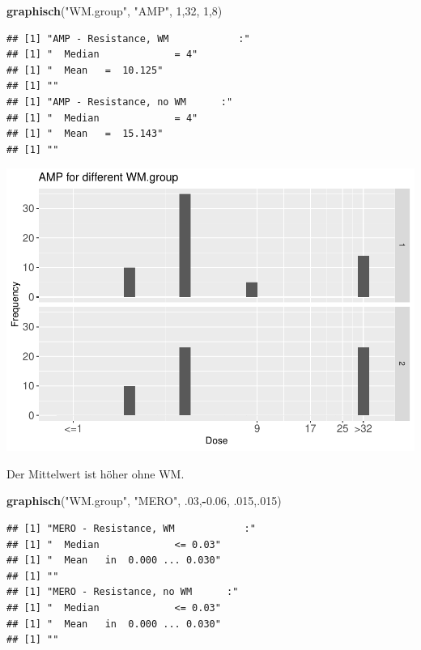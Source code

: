 \documentclass[
]{article}
\newenvironment{Shaded}{\begin{snugshade}}{\end{snugshade}}
\newcommand{\DecValTok}[1]{\textcolor[rgb]{0.00,0.00,0.81}{#1}}
\newcommand{\FloatTok}[1]{\textcolor[rgb]{0.00,0.00,0.81}{#1}}
\newcommand{\KeywordTok}[1]{\textcolor[rgb]{0.13,0.29,0.53}{\textbf{#1}}}
\newcommand{\NormalTok}[1]{#1}
\newcommand{\OperatorTok}[1]{\textcolor[rgb]{0.81,0.36,0.00}{\textbf{#1}}}
\newcommand{\StringTok}[1]{\textcolor[rgb]{0.31,0.60,0.02}{#1}}
\begin{document}
\begin{Shaded}
\begin{Highlighting}[]
  \KeywordTok{graphisch}\NormalTok{(}\StringTok{"WM.group"}\NormalTok{, }\StringTok{"AMP"}\NormalTok{, }\DecValTok{1}\NormalTok{,}\DecValTok{32}\NormalTok{, }\DecValTok{1}\NormalTok{,}\DecValTok{8}\NormalTok{)}
\end{Highlighting}
\end{Shaded}

\begin{verbatim}
## [1] "AMP - Resistance, WM            :"
## [1] "  Median             = 4"
## [1] "  Mean   =  10.125"
## [1] ""
## [1] "AMP - Resistance, no WM      :"
## [1] "  Median             = 4"
## [1] "  Mean   =  15.143"
## [1] ""
\end{verbatim}

\includegraphics{Verteilungen_files/figure-latex/unnamed-chunk-31-1.pdf}

Der Mittelwert ist höher ohne WM.

\begin{Shaded}
\begin{Highlighting}[]
  \KeywordTok{graphisch}\NormalTok{(}\StringTok{"WM.group"}\NormalTok{, }\StringTok{"MERO"}\NormalTok{, }\FloatTok{.03}\NormalTok{,}\OperatorTok{-}\FloatTok{0.06}\NormalTok{, }\FloatTok{.015}\NormalTok{,.}\DecValTok{015}\NormalTok{)}
\end{Highlighting}
\end{Shaded}

\begin{verbatim}
## [1] "MERO - Resistance, WM            :"
## [1] "  Median             <= 0.03"
## [1] "  Mean   in  0.000 ... 0.030"
## [1] ""
## [1] "MERO - Resistance, no WM      :"
## [1] "  Median             <= 0.03"
## [1] "  Mean   in  0.000 ... 0.030"
## [1] ""
\end{verbatim}
\end{document}
